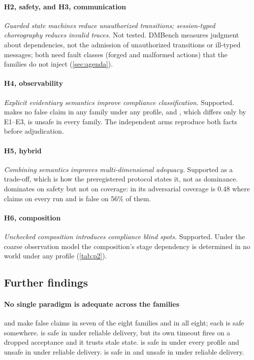 \paragraph{H2, safety, and H3, communication} \emph{Guarded state machines reduce unauthorized transitions; session-typed choreography reduces invalid traces.} Not tested. DMBench measures judgment about dependencies, not the admission of unauthorized transitions or ill-typed messages; both need fault classes (forged and malformed actions) that the families do not inject (\cref{sec:agenda}).

\paragraph{H4, observability} \emph{Explicit evidentiary semantics improve compliance classification.} Supported.  makes no false claim in any family under any profile, and , which differs only by E1--E3, is unsafe in every family. The independent arms reproduce both facts before adjudication.

\paragraph{H5, hybrid} \emph{Combining semantics improves multi-dimensional adequacy.} Supported as a trade-off, which is how the preregistered protocol states it, not as dominance.  dominates on safety but not on coverage: in  its adversarial coverage is 0.48 where  claims on every run and is false on 56\% of them.

\paragraph{H6, composition} \emph{Unchecked composition introduces compliance blind spots.} Supported. Under the coarse observation model the composition's stage dependency is determined in no world under any profile (\cref{tab:p2}).

\subsection{Further findings}

\paragraph{No single paradigm is adequate across the families}  and  make false claims in seven of the eight families and  in all eight; each is safe somewhere.  is safe in  under reliable delivery, but its own timeout fires on a dropped acceptance and it trusts stale state.  is safe in  under every profile and unsafe in  under reliable delivery.  is safe in  and unsafe in  under reliable delivery.


